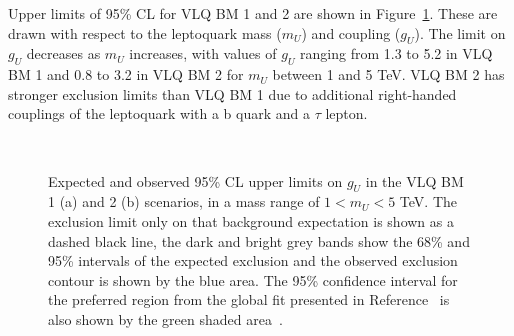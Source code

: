 Upper limits of 95\% \ac{CL} for VLQ BM 1 and 2 are shown in Figure~\ref{fig:vlq_limits}. 
These are drawn with respect to the leptoquark mass ($m_{U}$) and coupling ($g_{U}$).
The limit on $g_{U}$ decreases as $m_{U}$ increases, with values of $g_U$ ranging from 1.3 to 5.2 in VLQ BM 1 and 0.8 to 3.2 in VLQ BM 2 for $m_U$ between 1 and 5 TeV. 
VLQ BM 2 has stronger exclusion limits than VLQ BM 1 due to additional right-handed couplings of the leptoquark with a b quark and a $\tau$ lepton. \\

\begin{figure}[!hbtp]
\centering
     \\
\caption[Plots of the model-dependent limits in the vector leptoquark phase space.]{Expected and observed 95\% CL upper limits on $g_U$ in the VLQ BM 1 (a) and 2 (b) scenarios, in a mass range of $1<m_{U}<5$ TeV.  The exclusion limit only on that background expectation is shown as a dashed black line, the dark and bright grey bands show the 68\% and 95\% intervals of the expected exclusion and the observed exclusion contour is shown by the blue area. The 95\% confidence interval for the preferred region from the global fit presented in Reference~\cite{Cornella:2021sby} is also shown by the green shaded area~\cite{CMS:2022rbd}.}
\label{fig:vlq_limits}
\end{figure}


